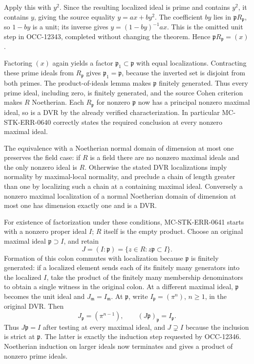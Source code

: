 Apply this with \(y^2\). Since the resulting localized ideal is prime and contains \(y^2\), it contains \(y\), giving the source equality \(y=ax+by^2\). The coefficient \(by\) lies in \(\mathfrak pR_{\mathfrak p}\), so \(1-by\) is a unit; its inverse gives \(y=(1-by)^{-1}ax\). This is the omitted unit step in OCC-12343, completed without changing the theorem. Hence \(\mathfrak pR_{\mathfrak p}=(x)\).

Factoring \((x)\) again yields a factor \(\mathfrak p_1\subset\mathfrak p\) with equal localizations. Contracting these prime ideals from \(R_{\mathfrak p}\) gives \(\mathfrak p_1=\mathfrak p\), because the inverted set is disjoint from both primes. The product-of-ideals lemma makes \(\mathfrak p\) finitely generated. Thus every prime ideal, including zero, is finitely generated, and the source Cohen criterion makes \(R\) Noetherian. Each \(R_{\mathfrak p}\) for nonzero \(\mathfrak p\) now has a principal nonzero maximal ideal, so is a DVR by the already verified characterization. In particular MC-STK-ERR-0640 correctly states the required conclusion at every nonzero maximal ideal.

The equivalence with a Noetherian normal domain of dimension at most one preserves the field case: if \(R\) is a field there are no nonzero maximal ideals and the only nonzero ideal is \(R\). Otherwise the stated DVR localizations imply normality by maximal-local normality, and preclude a chain of length greater than one by localizing such a chain at a containing maximal ideal. Conversely a nonzero maximal localization of a normal Noetherian domain of dimension at most one has dimension exactly one and is a DVR.

For existence of factorization under these conditions, MC-STK-ERR-0641 starts with a nonzero proper ideal \(I\); \(R\) itself is the empty product. Choose an original maximal ideal \(\mathfrak p\supset I\), and retain \[
 J=(I:\mathfrak p)=\{z\in R:z\mathfrak p\subset I\}.
\] Formation of this colon commutes with localization because \(\mathfrak p\) is finitely generated: if a localized element sends each of its finitely many generators into the localized \(I\), take the product of the finitely many membership denominators to obtain a single witness in the original colon. At a different maximal ideal, \(\mathfrak p\) becomes the unit ideal and \(J_{\mathfrak m}=I_{\mathfrak m}\). At \(\mathfrak p\), write \(I_{\mathfrak p}=(\pi^n)\), \(n\ge1\), in the original DVR. Then \[
 J_{\mathfrak p}=(\pi^{n-1}),\qquad
 (J\mathfrak p)_{\mathfrak p}=I_{\mathfrak p}.
\] Thus \(J\mathfrak p=I\) after testing at every maximal ideal, and \(J\supsetneq I\) because the inclusion is strict at \(\mathfrak p\). The latter is exactly the induction step requested by OCC-12346. Noetherian induction on larger ideals now terminates and gives a product of nonzero prime ideals.

